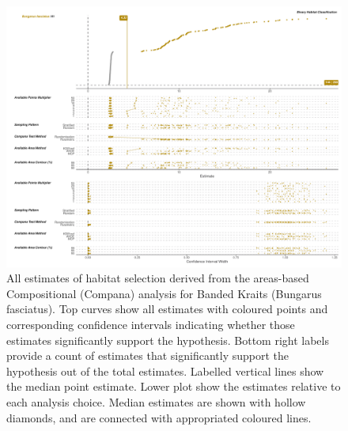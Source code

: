 \documentclass[10pt,a4paper]{article}
\begin{document}
\begin{figure}
\includegraphics[width=1\linewidth]{../../figures/specCurve_Bungarus fasciatus_area} \caption{All estimates of habitat selection derived from the areas-based Compositional (Compana) analysis for Banded Kraits (Bungarus fasciatus). Top curves show all estimates with coloured points and corresponding confidence intervals indicating whether those estimates significantly support the hypothesis. Bottom right labels provide a count of estimates that significantly support the hypothesis out of the total estimates. Labelled vertical lines show the median point estimate. Lower plot show the estimates relative to each analysis choice. Median estimates are shown with hollow diamonds, and are connected with appropriated coloured lines.}\label{fig:specCurveAreaBUFA}
\end{figure}
\end{document}
